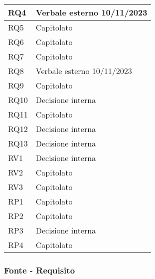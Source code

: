 \begin{center}
\begin{longtable}{|C{5cm}|C{5cm}|}
        \hline
        RQ4 & Verbale esterno 10/11/2023 \\
        \hline
        RQ5 & Capitolato \\
        \hline
        RQ6 & Capitolato \\
        \hline
        RQ7 & Capitolato \\
        \hline
        RQ8 & Verbale esterno 10/11/2023 \\
        \hline
        RQ9 & Capitolato \\
        \hline
        RQ10 & Decisione interna \\
        \hline
        RQ11 & Capitolato \\
        \hline
        RQ12 & Decisione interna \\
        \hline
        RQ13 & Decisione interna \\
        \hline
        \hline
        RV1 & Decisione interna \\
        \hline
        RV2 & Capitolato \\
        \hline
        RV3 & Capitolato \\
        \hline
        \hline
        RP1 & Capitolato \\
        \hline
        RP2 & Capitolato \\
        \hline
        RP3 & Decisione interna \\
        \hline
        RP4 & Capitolato \\
        \hline
    \end{longtable}
\end{center}

\subsubsection{Fonte - Requisito}

